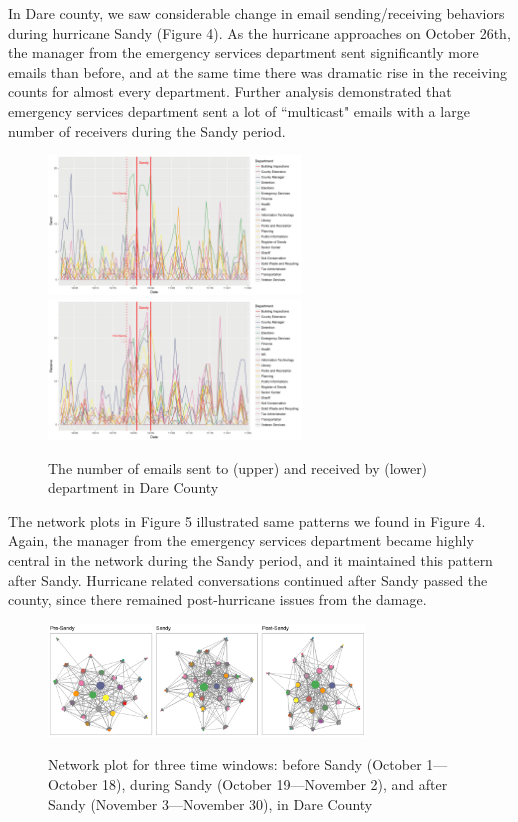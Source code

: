 \documentclass[a4paper]{article}
\begin{document}
In Dare county, we saw considerable change in email sending/receiving behaviors during hurricane Sandy (Figure 4). As the hurricane approaches on October 26th, the manager from the emergency services department sent significantly more emails than before, and at the same time there was dramatic rise in the receiving counts for almost every department. Further analysis demonstrated that emergency services department sent a lot of ``multicast" emails with a large number of receivers during the Sandy period. 
        \begin{figure}[H]
       	\centering
       	\includegraphics[width=0.6\textwidth]{plots/DareSend-1.png} 
       	\includegraphics[width=0.6\textwidth]{plots/DareReceive-1.png} 
       	\label{fig:SendReceiveDare}
       	\caption{The number of emails sent to (upper) and received by (lower) department in Dare County}
       \end{figure}
    
    The network plots in Figure 5 illustrated same patterns we found in Figure 4. Again, the manager from the emergency services department became highly central in the network during the Sandy period, and it maintained this pattern after Sandy. Hurricane related conversations continued after Sandy passed the county, since there remained post-hurricane issues from the damage.
         \begin{figure}[ht]
         	\centering
         	\includegraphics[width=0.75\textwidth]{plots/DareNetwork-1.png} 
         	\label{fig:NetworkDare}
         	\caption{Network plot for three time windows: before Sandy (October 1---October 18), during Sandy (October 19---November 2), and after Sandy (November 3---November 30), in Dare County}
         \end{figure}
         
\end{document}
